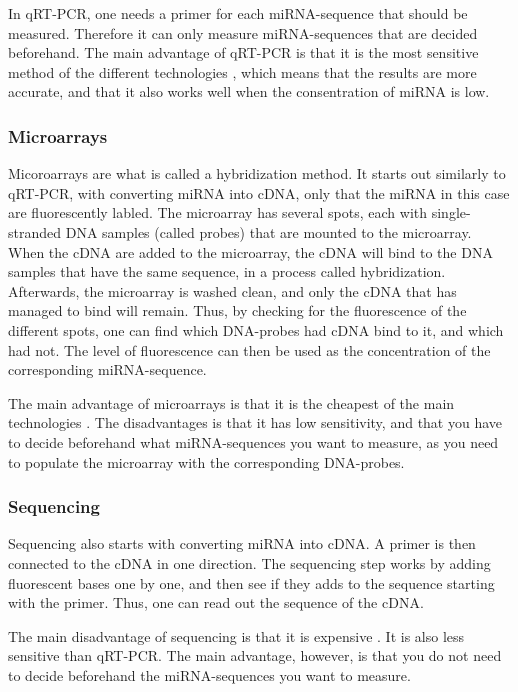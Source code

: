 In qRT-PCR, one needs a primer for each miRNA-sequence that should be measured. Therefore it can only measure miRNA-sequences that are decided beforehand. The main advantage of qRT-PCR is that it is the most sensitive method of the different technologies \citep{mirnatech}, which means that the results are more accurate, and that it also works well when the consentration of miRNA is low. 

\subsubsection{Microarrays}
Micoroarrays are what is called a hybridization method. It starts out similarly to qRT-PCR, with converting miRNA into cDNA, only that the miRNA in this case are fluorescently labled. The microarray has several spots, each with single-stranded DNA samples (called probes) that are mounted to the microarray. When the cDNA are added to the microarray, the cDNA will bind to the DNA samples that have the same sequence, in a process called hybridization. Afterwards, the microarray is washed clean, and only the cDNA that has managed to bind will remain. Thus, by checking for the fluorescence of the different spots, one can find which DNA-probes had cDNA bind to it, and which had not. The level of fluorescence can then be used as the concentration of the corresponding miRNA-sequence.

The main advantage of microarrays is that it is the cheapest of the main technologies \citep{mirnatech}. The disadvantages is that it has low sensitivity, and that you have to decide beforehand what miRNA-sequences you want to measure, as you need to populate the microarray with the corresponding DNA-probes.  

\subsubsection{Sequencing}
Sequencing also starts with converting miRNA into cDNA. A primer is then connected to the cDNA in one direction. The sequencing step works by adding fluorescent bases one by one, and then see if they adds to the sequence starting with the primer. Thus, one can read out the sequence of the cDNA.

The main disadvantage of sequencing is that it is expensive \citep{mirnatech}. It is also less sensitive than qRT-PCR. The main advantage, however, is that you do not need to decide beforehand the miRNA-sequences you want to measure.


